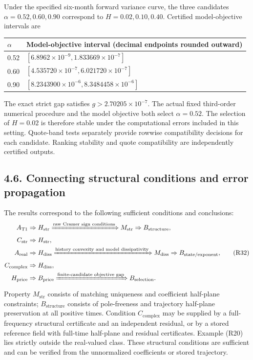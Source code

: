 \documentclass[a4paper,11pt]{article}
\begin{document}
Under the specified six-month forward variance curve, the three candidates \(\alpha=0.52,0.60,0.90\) correspond to \(H=0.02,0.10,0.40\). Certified model-objective intervals are

\begingroup\scriptsize\setlength{\tabcolsep}{3pt}
\begin{longtable}{L{0.445000\textwidth}L{0.445000\textwidth}}
\(\alpha\) & Model-objective interval (decimal endpoints rounded outward)\\
 & \([6.8962\times10^{-9},1.833669\times10^{-7}]\)\\
0.60 & \([4.535720\times10^{-7},6.021720\times10^{-7}]\)\\
0.90 & \([8.2343900\times10^{-6},8.3484458\times10^{-6}]\)\\
\end{longtable}\endgroup

The exact strict gap satisfies \(g>2.70205\times10^{-7}\). The actual fixed third-order numerical procedure and the model objective both select \(\alpha=0.52\). The selection of \(H=0.02\) is therefore stable under the computational errors included in this setting. Quote-band tests separately provide rowwise compatibility decisions for each candidate. Ranking stability and quote compatibility are independently certified outputs.

\subsection*{4.6. Connecting structural conditions and error propagation}

The results correspond to the following sufficient conditions and conclusions:
\[
\begin{aligned}
A_{\mathrm{T1}}&\Rightarrow H_{\mathrm{str}}
\xRightarrow{\text{raw Cramer sign conditions}}M_{\mathrm{str}}
\Rightarrow B_{\mathrm{structure}},\\
C_{\mathrm{str}}&\Rightarrow H_{\mathrm{str}},\\
A_{\mathrm{real}}&\Rightarrow H_{\mathrm{diss}}
\xRightarrow{\text{history convexity and model dissipativity}}M_{\mathrm{diss}}
\Rightarrow B_{\mathrm{state/exponent}},\\
C_{\mathrm{complex}}&\Rightarrow H_{\mathrm{diss}},\\
H_{\mathrm{price}}&\Rightarrow B_{\mathrm{price}}
\xRightarrow{\text{finite-candidate objective gap}}B_{\mathrm{selection}}.
\end{aligned}
\tag{R32}
\]
Property \(M_{\mathrm{str}}\) consists of matching uniqueness and coefficient half-plane constraints; \(B_{\mathrm{structure}}\) consists of pole-freeness and trajectory half-plane preservation at all positive times. Condition \(C_{\mathrm{complex}}\) may be supplied by a full-frequency structural certificate and an independent residual, or by a stored reference field with full-time half-plane and residual certificates. Example (R20) lies strictly outside the real-valued class. These structural conditions are sufficient and can be verified from the unnormalized coefficients or stored trajectory.
\end{document}
